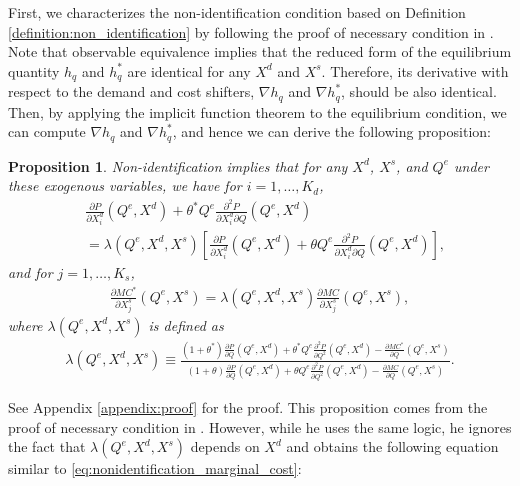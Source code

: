 \documentclass[11pt, a4paper]{article}
\newtheorem{proposition}{Proposition}
\theoremstyle{remark}
\begin{document}
First, we characterizes the non-identification condition based on Definition \ref{definition:non_identification} by following the proof of necessary condition in \citet{lau1982identifying}.
Note that observable equivalence implies that the reduced form of the equilibrium quantity $h_q$ and $h_q^{*}$ are identical for any $X^{d}$ and $X^{s}$.
Therefore, its derivative with respect to the demand and cost shifters, $\nabla h_q$ and $\nabla h_q^{*}$, should be also identical.
Then, by applying the implicit function theorem to the equilibrium condition, we can compute $\nabla h_q$ and $\nabla h_q^{*}$, and hence we can derive the following proposition:
\begin{proposition}\label{proposition:non-identification_charaterization}
    Non-identification implies that for any $X^{d}$, $X^{s}$, and $Q^e$ under these exogenous variables, we have for $i = 1, \ldots, K_d$,
    \begin{align}
        &\frac{\partial P}{\partial X^{d}_{i}}(Q^e, X^{d}) + \theta^{*} Q^e \frac{\partial^2 P}{\partial X^{d}_{i}\partial Q}(Q^e, X^{d})\\  
        &= \lambda(Q^e, X^{d}, X^{s})\left[ \frac{\partial P}{\partial X^{d}_{i}}(Q^e, X^{d}) + \theta Q^e \frac{\partial^2 P}{\partial X^{d}_{i}\partial Q}(Q^e, X^{d}) \right], \label{eq:nonidentification_demand}
    \end{align}
    and for $j = 1,\ldots, K_s$,
    \begin{align}
        \frac{\partial MC^{*}}{\partial X^{s}_j}(Q^e, X^{s}) = \lambda(Q^e, X^{d}, X^{s}) \frac{\partial MC}{\partial X^{s}_j}(Q^e, X^{s}),\label{eq:nonidentification_marginal_cost}
    \end{align}
    where $\lambda(Q^e, X^{d}, X^{s})$ is defined as
    \begin{align}
        \lambda(Q^e, X^{d}, X^{s}) \equiv \frac{(1+\theta^{*})\frac{\partial P}{\partial Q}(Q^e, X^{d}) + \theta^{*} Q^e\frac{\partial^2 P}{\partial Q^2}(Q^e, X^{d}) - \frac{\partial MC^{*}}{\partial Q}(Q^e, X^{s})}{(1+\theta)\frac{\partial P}{\partial Q}(Q^e, X^{d}) + \theta Q^e\frac{\partial^2 P}{\partial Q^2}(Q^e, X^{d}) - \frac{\partial MC}{\partial Q}(Q^e, X^{s})}. \label{eq:lambda_foc}
    \end{align}
\end{proposition}
See Appendix \ref{appendix:proof} for the proof.
This proposition comes from the proof of necessary condition in \citet{lau1982identifying}.
However, while he uses the same logic, he ignores the fact that $\lambda(Q^e, X^{d}, X^{s})$ depends on $X^{d}$ and obtains the following equation similar to \eqref{eq:nonidentification_marginal_cost}:
\end{document}
